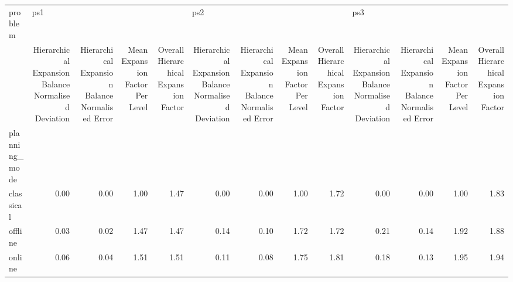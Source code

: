 \begin{tabular}{lrrrrrrrrrrrr}
\toprule
problem & \multicolumn{4}{l}{ps1} & \multicolumn{4}{l}{ps2} & \multicolumn{4}{l}{ps3} \\
{} & Hierarchical Expansion Balance Normalised Deviation & Hierarchical Expansion Balance Normalised Error & Mean Expansion Factor Per Level & Overall Hierarchical Expansion Factor & Hierarchical Expansion Balance Normalised Deviation & Hierarchical Expansion Balance Normalised Error & Mean Expansion Factor Per Level & Overall Hierarchical Expansion Factor & Hierarchical Expansion Balance Normalised Deviation & Hierarchical Expansion Balance Normalised Error & Mean Expansion Factor Per Level & Overall Hierarchical Expansion Factor \\
planning\_mode &                                                     &                                                 &                                 &                                       &                                                     &                                                 &                                 &                                       &                                                     &                                                 &                                 &                                       \\
\midrule
classical     &                                               0.00 &                                            0.00 &                            1.00 &                                  1.47 &                                               0.00 &                                            0.00 &                            1.00 &                                  1.72 &                                               0.00 &                                            0.00 &                            1.00 &                                  1.83 \\
offline       &                                               0.03 &                                            0.02 &                            1.47 &                                  1.47 &                                               0.14 &                                            0.10 &                            1.72 &                                  1.72 &                                               0.21 &                                            0.14 &                            1.92 &                                  1.88 \\
online        &                                               0.06 &                                            0.04 &                            1.51 &                                  1.51 &                                               0.11 &                                            0.08 &                            1.75 &                                  1.81 &                                               0.18 &                                            0.13 &                            1.95 &                                  1.94 \\
\bottomrule
\end{tabular}
